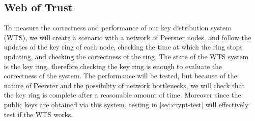 \documentclass[]{article}
\begin{document}
        \subsection{Web of Trust}
        To measure the correctness and performance of our key distribution system (WTS), we will create a scenario with a network of Peerster nodes, and follow the updates of the key ring of each node, checking the time at which the ring stops updating, and checking the correctness of the ring. The state of the WTS system is the key ring, therefore checking the key ring is enough to evaluate the correctness of the system. The performance will be tested, but because of the nature of Peerster and the possibility of network bottlenecks, we will check that the key ring is complete after a reasonable amount of time. Moreover since the public keys are obtained via this system, testing in \ref{sec:crypt-test} will effectively test if the WTS works.
    
    {}
    
    
\end{document}
